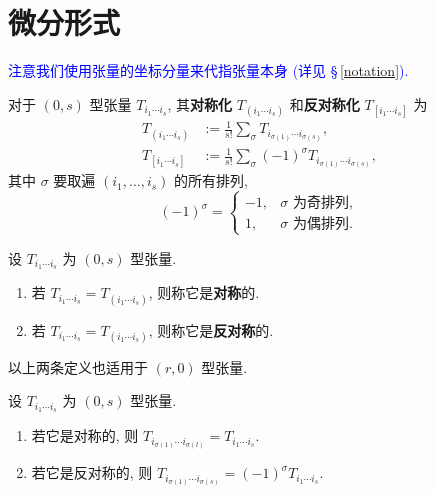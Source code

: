 \section{微分形式}
\textcolor{blue}{注意我们使用张量的坐标分量来代指张量本身 (详见 \S\,\ref{notation}).}
\begin{definition}[对称化与反对称化]
    对于 $ (0,s) $ 型张量 $ T_{i_1\cdots i_s} $, 其{\bf 对称化} $ T_{(i_1\cdots i_s)} $ 和{\bf 反对称化} $ T_{[i_1\cdots i_s]} $ 为 
    \begin{align*}
        T_{(i_1\cdots i_s)} &:= \frac{1}{s!}\sum_{\sigma} T_{i_{\sigma(1)}\cdots i_{\sigma(s)}},\\
        T_{[i_1\cdots i_s]} &:= \frac{1}{s!}\sum_{\sigma}(-1)^{\sigma} T_{i_{\sigma(1)}\cdots i_{\sigma(s)}},
    \end{align*}
    其中 $ \sigma $ 要取遍 $ (i_1,\dots,i_s) $ 的所有排列, 
    \[ (-1)^\sigma=\begin{cases}
        -1, & \sigma\text{ 为奇排列},\\
        1, & \sigma\text{ 为偶排列}.
    \end{cases} \]
\end{definition}
\begin{definition}[对称与反对称]
    设 $ T_{i_1\cdots i_s} $ 为 $ (0,s) $ 型张量.
    \begin{enumerate}
        \item 若 $T_{i_1\cdots i_s}=T_{(i_1\cdots i_s)}$, 则称它是{\bf 对称}的.
        \item 若 $ T_{i_1\cdots i_s}=T_{(i_1\cdots i_s)}$, 则称它是{\bf 反对称}的. 
    \end{enumerate}
\end{definition}
\begin{remark}
    以上两条定义也适用于 $ (r,0) $ 型张量.
\end{remark}

\begin{theorem}
    设 $ T_{i_1\cdots i_s} $ 为 $ (0,s) $ 型张量.
    \begin{enumerate}
        \item 若它是对称的, 则 $T_{i_{\sigma(1)}\cdots i_{\sigma(l)}}=T_{i_1\cdots i_s}$.
        \item 若它是反对称的, 则 $T_{i_{\sigma(1)}\cdots i_{\sigma(s)}}=(-1)^{\sigma}T_{i_1\cdots i_s}$.
    \end{enumerate}
\end{theorem}

